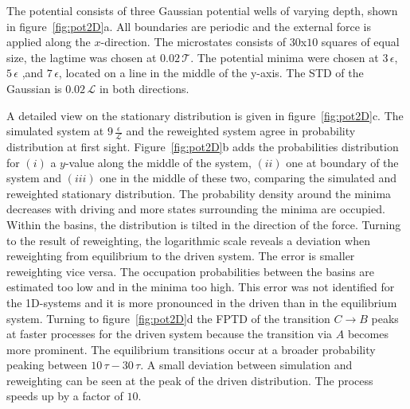 The potential consists of three Gaussian potential wells of varying depth, shown in figure~\ref{fig:pot2D}a. All boundaries are periodic and the external force is applied along the $x$-direction. The microstates consists of $30$x$10$ squares of equal size, the lagtime was chosen at $0.02\,\mathcal{T}$. The potential minima were chosen at $3\,\epsilon$, $5\,\epsilon$ ,and $7\,\epsilon$, located on a line in the middle of the y-axis. The STD of the Gaussian is $0.02\,\mathcal{L}$ in both directions.    

A detailed view on the stationary distribution is given in figure~\ref{fig:pot2D}c. The simulated system at $9\,\frac{\epsilon}{\mathcal{L}}$ and the reweighted system agree in probability distribution at first sight. Figure~\ref{fig:pot2D}b adds the probabilities distribution for $(i)$ a $y$-value along the middle of the system, $(ii)$ one at boundary of the system and $(iii)$ one in the middle of these two, comparing the simulated and reweighted stationary distribution.  The probability density around the minima decreases with driving and more states surrounding the minima are occupied. Within the basins, the distribution is tilted in the direction of the force. Turning to the result of reweighting, the logarithmic scale reveals a deviation when reweighting from equilibrium to the driven system. The error is smaller reweighting vice versa. The occupation probabilities between the basins are estimated too low and in the minima too high. This error was not identified for the 1D-systems and it is more pronounced in the driven than in the equilibrium system. Turning to figure~\ref{fig:pot2D}d the FPTD of the transition $C \rightarrow B$ peaks at faster processes for the driven system because the transition via $A$ becomes more prominent. The equilibrium transitions occur at a broader probability peaking between $10\,\tau-30\,\tau$.  A small deviation between simulation and reweighting can be seen at the peak of the driven distribution. The process speeds up by a factor of $10$.    
